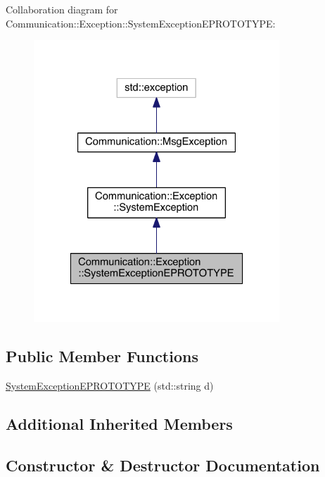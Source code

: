 Collaboration diagram for Communication\+:\+:Exception\+:\+:System\+Exception\+E\+P\+R\+O\+T\+O\+T\+Y\+P\+E\+:\nopagebreak
\begin{figure}[H]
\begin{center}
\leavevmode
\includegraphics[width=262pt]{class_communication_1_1_exception_1_1_system_exception_e_p_r_o_t_o_t_y_p_e__coll__graph}
\end{center}
\end{figure}
\subsection*{Public Member Functions}
\begin{DoxyCompactItemize}
\item 
\hyperlink{class_communication_1_1_exception_1_1_system_exception_e_p_r_o_t_o_t_y_p_e_a7f7c90a3a1fc4c17ae1982aeb86276ef}{System\+Exception\+E\+P\+R\+O\+T\+O\+T\+Y\+P\+E} (std\+::string d)
\end{DoxyCompactItemize}
\subsection*{Additional Inherited Members}


\subsection{Constructor \& Destructor Documentation}
\hypertarget{class_communication_1_1_exception_1_1_system_exception_e_p_r_o_t_o_t_y_p_e_a7f7c90a3a1fc4c17ae1982aeb86276ef}{}
